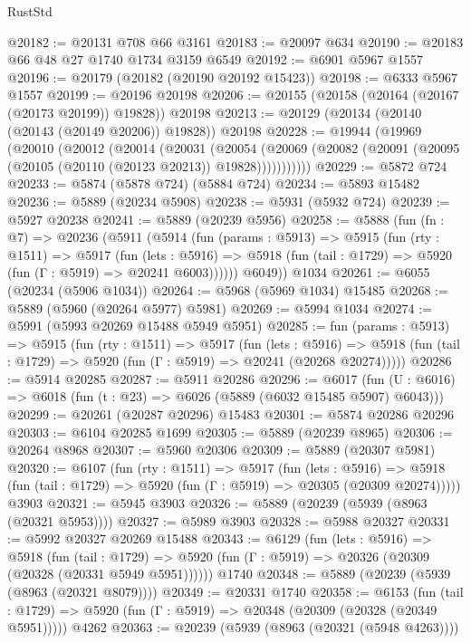 \begin{lexlean}{RustStd}
\begin{coremodule}
@20182 := @20131 @708 @66 @3161
@20183 := @20097 @634
@20190 := @20183 @66 @48 @27 @1740 @1734 @3159 @6549
@20192 := @6901 @5967 @1557
@20196 := @20179 (@20182 (@20190 @20192 @15423))
@20198 := @6333 @5967 @1557
@20199 := @20196 @20198
@20206 := @20155 (@20158 (@20164 (@20167 (@20173 @20199)) @19828)) @20198
@20213 := @20129 (@20134 (@20140 (@20143 (@20149 @20206)) @19828)) @20198
@20228 := @19944
    (@19969
      (@20010
        (@20012
          (@20014
            (@20031
              (@20054
                (@20069 (@20082 (@20091 (@20095 (@20105 (@20110 (@20123 @20213)) @19828)))))))))))
@20229 := @5872 @724
@20233 := @5874 (@5878 @724) (@5884 @724)
@20234 := @5893 @15482
@20236 := @5889 (@20234 @5908)
@20238 := @5931 (@5932 @724)
@20239 := @5927 @20238
@20241 := @5889 (@20239 @5956)
@20258 := @5888
    (fun (fn : @7) =>
    @20236
      (@5911
        (@5914
          (fun (params : @5913) =>
          @5915
            (fun (rty : @1511) =>
            @5917
              (fun (lets : @5916) =>
              @5918 (fun (tail : @1729) => @5920 (fun (Γ : @5919) => @20241 @6003))))))
        @6049))
    @1034
@20261 := @6055 (@20234 (@5906 @1034))
@20264 := @5968 (@5969 @1034) @15485
@20268 := @5889 (@5960 (@20264 @5977) @5981)
@20269 := @5994 @1034
@20274 := @5991 (@5993 @20269 @15488 @5949 @5951)
@20285 := fun (params : @5913) =>
  @5915
    (fun (rty : @1511) =>
    @5917
      (fun (lets : @5916) =>
      @5918 (fun (tail : @1729) => @5920 (fun (Γ : @5919) => @20241 (@20268 @20274)))))
@20286 := @5914 @20285
@20287 := @5911 @20286
@20296 := @6017
    (fun (U : @6016) => @6018 (fun (t : @23) => @6026 (@5889 (@6032 @15485 @5907) @6043)))
@20299 := @20261 (@20287 @20296) @15483
@20301 := @5874 @20286 @20296
@20303 := @6104 @20285 @1699
@20305 := @5889 (@20239 @8965)
@20306 := @20264 @8968
@20307 := @5960 @20306
@20309 := @5889 (@20307 @5981)
@20320 := @6107
    (fun (rty : @1511) =>
    @5917
      (fun (lets : @5916) =>
      @5918 (fun (tail : @1729) => @5920 (fun (Γ : @5919) => @20305 (@20309 @20274)))))
    @3903
@20321 := @5945 @3903
@20326 := @5889 (@20239 (@5939 (@8963 (@20321 @5953))))
@20327 := @5989 @3903
@20328 := @5988 @20327
@20331 := @5992 @20327 @20269 @15488
@20343 := @6129
    (fun (lets : @5916) =>
    @5918
      (fun (tail : @1729) =>
      @5920 (fun (Γ : @5919) => @20326 (@20309 (@20328 (@20331 @5949 @5951))))))
    @1740
@20348 := @5889 (@20239 (@5939 (@8963 (@20321 @8079))))
@20349 := @20331 @1740
@20358 := @6153
    (fun (tail : @1729) => @5920 (fun (Γ : @5919) => @20348 (@20309 (@20328 (@20349 @5951)))))
    @4262
@20363 := @20239 (@5939 (@8963 (@20321 (@5948 @4263))))

\end{coremodule}
\end{lexlean}
